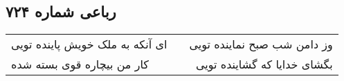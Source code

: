\begin{center}
\section*{رباعی شماره ۷۲۴}
\label{sec:sh724}
\begin{longtable}{l p{0.5cm} r}
ای آنکه به ملک خویش پاینده تویی
&&
وز دامن شب صبح نماینده تویی
\\
کار من بیچاره قوی بسته شده
&&
بگشای خدایا که گشاینده تویی
\\
\end{longtable}
\end{center}
